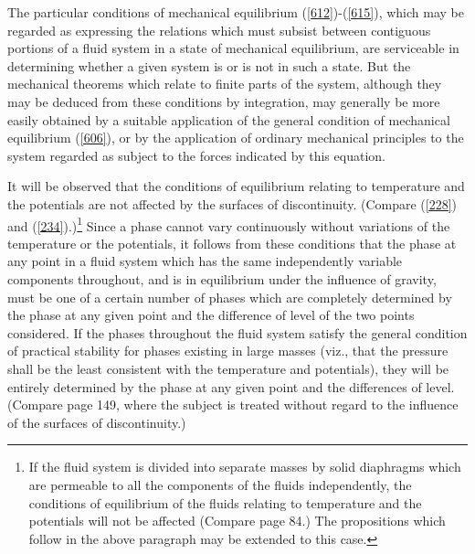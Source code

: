 \documentclass[12pt]{article}
\begin{document}
The particular conditions of mechanical equilibrium (\ref{612})-(\ref{615}), which may be regarded as expressing the relations which must subsist between contiguous portions of a fluid system in a state of mechanical equilibrium, are serviceable in determining whether a given system is or is not in such a state. But the mechanical theorems which relate to finite parts of the system, although they may be deduced from these conditions by integration, may generally be more easily obtained by a suitable application of the general condition of mechanical equilibrium (\ref{606}), or by the application of ordinary mechanical principles to the system regarded as subject to the forces indicated by this equation.

It will be observed that the conditions of equilibrium relating to temperature and the potentials are not affected by the surfaces of discontinuity. (Compare (\ref{228}) and (\ref{234}).)\footnote{If the fluid system is divided into separate masses by solid diaphragms which are permeable to all the components of the fluids independently, the conditions of equilibrium of the fluids relating to temperature and the potentials will not be affected (Compare page 84.) The propositions which follow in the above paragraph may be extended to this case.} Since a phase cannot vary continuously without variations of the temperature or the potentials, it follows from these conditions that the phase at any point in a fluid system which has the same independently variable components throughout, and is in equilibrium under the influence of gravity, must be one of a certain number of phases which are completely determined by the phase at any given point and the difference of level of the two points considered. If the phases throughout the fluid system satisfy the general condition of practical stability for phases existing in large masses (viz., that the pressure shall be the least consistent with the temperature and potentials), they will be entirely determined by the phase at any given point and the differences of level. (Compare page 149, where the subject is treated without regard to the influence of the surfaces of discontinuity.)
\end{document}

